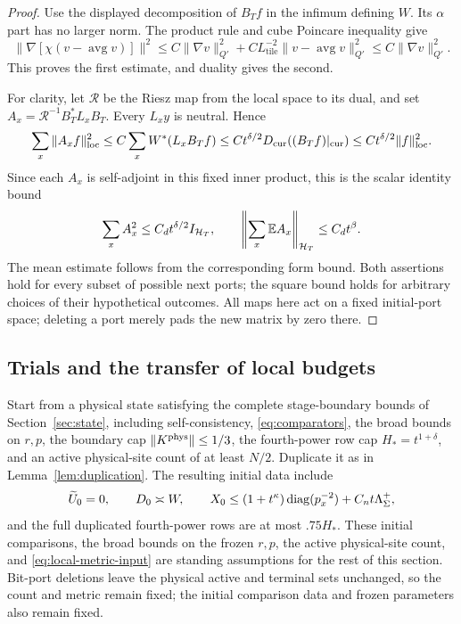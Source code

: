 \begin{proof}
Use the displayed decomposition of \(B_Tf\) in the infimum defining
\(W\).  Its \(\alpha\) part has no larger norm.  The product rule and
cube Poincare inequality give
\[
 \|\nabla[\chi(v-\operatorname{avg}v)]\|^2
 \le C\|\nabla v\|_{Q'}^2
      +CL_{\mathrm{tile}}^{-2}\|v-\operatorname{avg}v\|_{Q'}^2
 \le C\|\nabla v\|_{Q'}^2.
\]
This proves the first estimate, and duality gives the second.

For clarity, let \(\mathcal R\) be the Riesz map from the local space
to its dual, and set \(A_x=\mathcal R^{-1}B_T^*L_xB_T\).  Every
\(L_xy\) is neutral.  Hence
\[
 \sum_x\|A_xf\|_{\rm loc}^2
 \le C\sum_x W^*(L_xB_Tf)
 \le Ct^{\delta/2}D_{\rm cur}((B_Tf)|_{\rm cur})
 \le Ct^{\delta/2}\|f\|_{\rm loc}^2.
\]
Since each \(A_x\) is self-adjoint in this fixed inner product, this
is the scalar identity bound
\[
 \sum_x A_x^2\le C_d t^{\delta/2}I_{\mathcal H_T},\qquad
 \left\|\sum_x\mathbb E A_x\right\|_{\mathcal H_T}\le C_d t^\beta.
\]
The mean estimate follows from the corresponding form bound.  Both
assertions hold for every subset of possible next ports; the square
bound holds for arbitrary choices of their hypothetical outcomes.
All maps here act on a fixed initial-port space; deleting a port
merely pads the new matrix by zero there.
\end{proof}

\subsection{Trials and the transfer of local budgets}

Start from a physical state satisfying the complete stage-boundary
bounds of Section~\ref{sec:state}, including self-consistency,
\eqref{eq:comparators}, the broad bounds on \(r,p\), the boundary cap
\(\|K^{\rm phys}\|\le1/3\), the fourth-power row cap \(H_*=t^{1+\delta}\),
and an active physical-site count of at least \(N/2\).  Duplicate it
as in Lemma~\ref{lem:duplication}.  The resulting initial data include
\[
 \widetilde U_0=0,\qquad D_0\asymp W,\qquad
 X_0\le(1+t^\kappa)\operatorname{diag}(p_x^{-2})+C_nt\Lambda^+_\Sigma,
\]
and the full duplicated fourth-power rows are at most \(.75H_*\).
These initial comparisons, the broad bounds on the frozen \(r,p\),
the active physical-site count, and \eqref{eq:local-metric-input} are
standing assumptions for the rest of this section.  Bit-port deletions
leave the physical active and terminal sets unchanged, so the count and
metric remain fixed; the initial comparison data and frozen parameters
also remain fixed.

